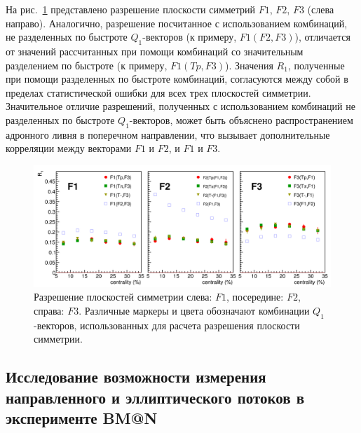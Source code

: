 На рис.~\ref{fig:bmn_combinations} представлено разрешение плоскости симметрий $F1$, $F2$, $F3$ (слева направо). 
Аналогично, разрешение посчитанное с использованием комбинаций, не разделенных по быстроте $Q_1$-векторов (к примеру, $F1(F2,F3)$), отличается от значений рассчитанных при помощи комбинаций со значительным разделением по быстроте (к примеру, $F1(Tp,F3)$).
Значения $R_1$, полученные при помощи разделенных по быстроте комбинаций, согласуются между собой в пределах статистической ошибки для всех трех плоскостей симметрии. 
Значительное отличие разрешений, полученных с использованием комбинаций не разделенных по быстроте $Q_1$-векторов, может быть объяснено распространением адронного ливня в поперечном направлении, что вызывает дополнительные корреляции между векторами $F1$ и $F2$, и $F1$ и $F3$.
%
\begin{figure}[ht]
\begin{center}
\includegraphics[width=0.95\linewidth]{images/R1_F123_combinations_centrality.png}
\caption{Разрешение плоскостей симметрии слева: $F1$, посередине: $F2$, справа: $F3$. Различные маркеры и цвета обозначают комбинации $Q_1$-векторов, использованных для расчета разрешения плоскости симметрии.}
\label{fig:bmn_combinations}
\end{center}
\end{figure}

\subsection{Исследование возможности измерения направленного и эллиптического потоков в эксперименте BM@N}

